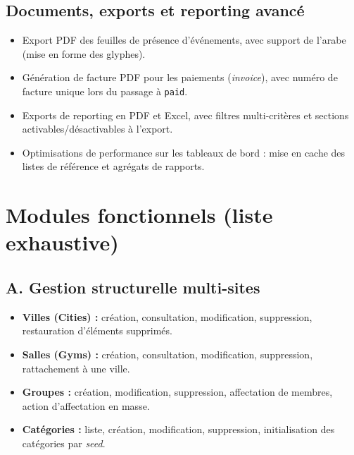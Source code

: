 \documentclass[12pt, a4paper]{article}
\begin{document}
\subsection{Documents, exports et reporting avancé}
\begin{itemize}
    \item Export PDF des feuilles de présence d'événements, avec support de l'arabe (mise en forme des glyphes).
    \item Génération de facture PDF pour les paiements (\textit{invoice}), avec numéro de facture unique lors du passage à \texttt{paid}.
    \item Exports de reporting en PDF et Excel, avec filtres multi-critères et sections activables/désactivables à l'export.
    \item Optimisations de performance sur les tableaux de bord : mise en cache des listes de référence et agrégats de rapports.
\end{itemize}

\section{Modules fonctionnels (liste exhaustive)}
\subsection{A. Gestion structurelle multi-sites}
\begin{itemize}
    \item \textbf{Villes (Cities) :} création, consultation, modification, suppression, restauration d'éléments supprimés.
    \item \textbf{Salles (Gyms) :} création, consultation, modification, suppression, rattachement à une ville.
    \item \textbf{Groupes :} création, modification, suppression, affectation de membres, action d'affectation en masse.
    \item \textbf{Catégories :} liste, création, modification, suppression, initialisation des catégories par \textit{seed}.
\end{itemize}
\end{document}
